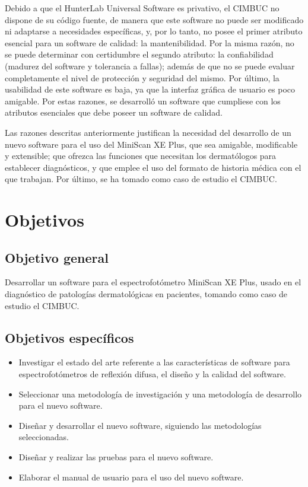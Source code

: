Debido a que el HunterLab Universal Software es privativo, el CIMBUC no dispone de su c\'{o}digo fuente, de manera que este software no puede ser modificado ni adaptarse a necesidades espec\'{i}ficas, y, por lo tanto, no posee el primer atributo esencial para un software de calidad: la mantenibilidad. Por la misma raz\'{o}n, no se puede determinar con certidumbre el segundo atributo: la confiabilidad (madurez del software y tolerancia a fallas); adem\'{a}s de que no se puede evaluar completamente el nivel de protecci\'{o}n y seguridad del mismo. Por \'{u}ltimo, la usabilidad de este software es baja, ya que la interfaz gr\'{a}fica de usuario es poco amigable. Por estas razones, se desarroll\'{o} un software que cumpliese con los atributos esenciales que debe poseer un software de calidad.

Las razones descritas anteriormente justifican la necesidad del desarrollo de un nuevo software para el uso del MiniScan XE Plus, que sea amigable, modificable y extensible; que ofrezca las funciones que necesitan los dermat\'{o}logos para establecer diagn\'{o}sticos, y que emplee el uso del formato de historia m\'{e}dica con el que trabajan. Por \'{u}ltimo, se ha tomado como caso de estudio el CIMBUC.

	\section{Objetivos}

		\subsection{Objetivo general}
	Desarrollar un software para el espectrofot\'{o}metro MiniScan XE Plus, usado en el diagn\'{o}stico de patolog\'{i}as dermatol\'{o}gicas en pacientes, tomando como caso de estudio el CIMBUC.
		\subsection{Objetivos espec\'{i}ficos}
			\begin{itemize}
				\item Investigar el estado del arte referente a las caracter\'{i}sticas de software para espectrofot\'{o}metros de reflexi\'{o}n difusa, el dise\~{n}o y la calidad del software.
				\item Seleccionar una metodolog\'{i}a de investigaci\'{o}n y una metodolog\'{i}a de desarrollo para el nuevo software.
				\item Dise\~{n}ar  y desarrollar el nuevo software, siguiendo las metodolog\'{i}as \mbox{seleccionadas}.
				\item Dise\~{n}ar y realizar las pruebas para el nuevo software.
				\item Elaborar el manual de usuario para el uso del nuevo software.
			\end{itemize}